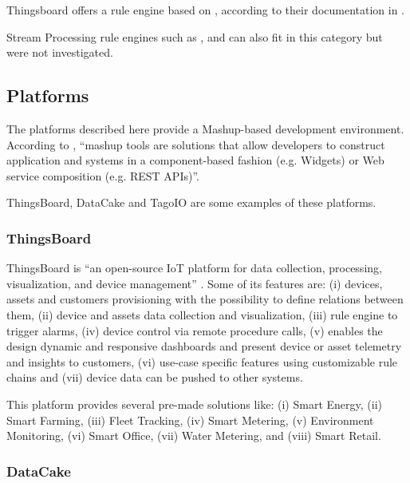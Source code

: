 Thingsboard offers a rule engine based on , according to their documentation in .

Stream Processing rule engines such as ,  and  can also fit in this category but were not investigated.

\subsection{Platforms}
\label{subsec:stateofart:arch:platforms}

The platforms described here provide a Mashup-based development environment. According to \cite{DIAS2022100529}, ``mashup tools are solutions that allow developers to construct application and systems in a component-based fashion (e.g. Widgets) or Web service composition (e.g. REST APIs)''.

ThingsBoard, DataCake and TagoIO are some examples of these platforms.

\subsubsection{ThingsBoard}
\label{subsubsec:stateofart:arch:platforms:thingsboard}

ThingsBoard is ``an open-source IoT platform for data collection, processing, visualization, and device management'' \parencite{thingsboard}. Some of its features are: (i) devices, assets and customers provisioning with the possibility to define relations between them, (ii) device and assets data collection and visualization, (iii) rule engine to trigger alarms, (iv) device control via remote procedure calls, (v) enables the design dynamic and responsive dashboards and present device or asset telemetry and insights to customers, (vi) use-case specific features using customizable rule chains and (vii) device data can be pushed to other systems.

This platform provides several pre-made solutions like: (i) Smart Energy, (ii) Smart Farming, (iii) Fleet Tracking, (iv) Smart Metering, (v) Environment Monitoring, (vi) Smart Office, (vii) Water Metering, and (viii) Smart Retail.

\subsubsection{DataCake}
\label{subsubsec:stateofart:arch:platforms:datacake}

